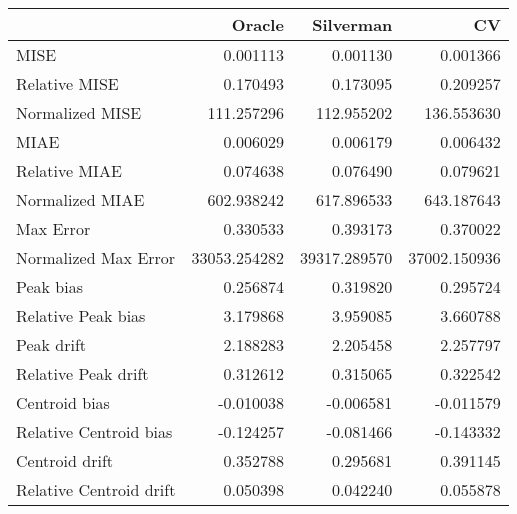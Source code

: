 \begin{tabular}{lrrr}
  \hline
 & Oracle & Silverman & CV \\ 
  \hline
MISE & 0.001113 & 0.001130 & 0.001366 \\ 
  Relative MISE & 0.170493 & 0.173095 & 0.209257 \\ 
  Normalized MISE & 111.257296 & 112.955202 & 136.553630 \\ 
  MIAE & 0.006029 & 0.006179 & 0.006432 \\ 
  Relative MIAE & 0.074638 & 0.076490 & 0.079621 \\ 
  Normalized MIAE & 602.938242 & 617.896533 & 643.187643 \\ 
  Max Error & 0.330533 & 0.393173 & 0.370022 \\ 
  Normalized Max Error & 33053.254282 & 39317.289570 & 37002.150936 \\ 
  Peak bias & 0.256874 & 0.319820 & 0.295724 \\ 
  Relative Peak bias & 3.179868 & 3.959085 & 3.660788 \\ 
  Peak drift & 2.188283 & 2.205458 & 2.257797 \\ 
  Relative Peak drift & 0.312612 & 0.315065 & 0.322542 \\ 
  Centroid bias & -0.010038 & -0.006581 & -0.011579 \\ 
  Relative Centroid bias & -0.124257 & -0.081466 & -0.143332 \\ 
  Centroid drift & 0.352788 & 0.295681 & 0.391145 \\ 
  Relative Centroid drift & 0.050398 & 0.042240 & 0.055878 \\ 
   \hline
\end{tabular}

